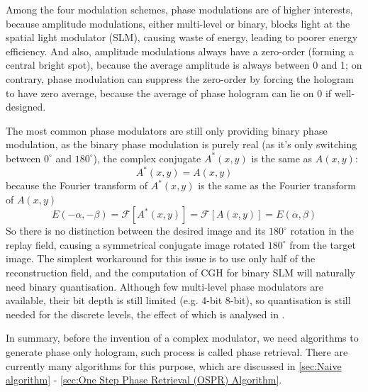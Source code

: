 Among the four modulation schemes, phase modulations are of higher interests, because amplitude modulations, either multi-level or binary, blocks light at the spatial light modulator (SLM), causing waste of energy, leading to poorer energy efficiency. And also, amplitude modulations always have a zero-order (forming a central bright spot), because the average amplitude is always between 0 and 1; on contrary, phase modulation can suppress the zero-order by forcing the hologram to have zero average, because the average of phase hologram can lie on 0 if well-designed.

The most common phase modulators are still only providing binary phase modulation, as the binary phase modulation is purely real (as it's only switching between $0^\circ$ and $180^\circ$), the complex conjugate $A^*(x,y)$ is the same as $A(x,y)$:
\begin{equation} \label{eq:AequalsAstar}
  A^*(x,y) = A(x,y)
\end{equation}
because the Fourier transform of $A^*(x,y)$ is the same as the Fourier transform of $A(x,y)$
\begin{equation} \label{eq:AAstar}
  E(-\alpha, -\beta)=\mathcal{F}[A^*(x,y)]=\mathcal{F}[A(x,y)]=E(\alpha, \beta)
\end{equation}
So there is no distinction between the desired image and its $180^\circ$ rotation in the replay field, causing a symmetrical conjugate image rotated $180^\circ$ from the target image. The simplest workaround for this issue is to use only half of the reconstruction field, and the computation of CGH for binary SLM will naturally need binary quantisation. Although few multi-level phase modulators are available, their bit depth is still limited (e.g. 4-bit 8-bit), so quantisation is still needed for the discrete levels, the effect of which is analysed in \cite{Kadis2022}.

In summary, before the invention of a complex modulator, we need algorithms to generate phase only hologram, such process is called phase retrieval. There are currently many algorithms for this purpose, which are discussed in \cref{sec:Naive algorithm} - \cref{sec:One Step Phase Retrieval (OSPR) Algorithm}.


